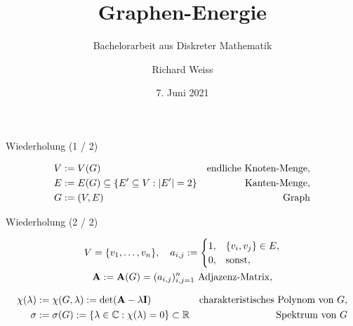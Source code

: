 \documentclass[aspectratio = 169]{beamer}
\title[Graphen-Energie]{Graphen-Energie}
\subtitle{Bachelorarbeit aus Diskreter Mathematik}
\author[R. Weiss]{Richard Weiss}
\institute[TU Wien]{TU Wien, Vienna, Austria}
\date{7. Juni 2021}
\begin{document}

\begin{frame}
    \titlepage
\end{frame}            


\begin{frame}{Wiederholung (1 / 2)}

    \begin{definition*}
    
        \begin{align*}
            V & := V(G)                                                          & \text{endliche Knoten-Menge}, \\
            E & := E(G) \subseteq {\left \{ E^\prime \subseteq V: |E^\prime| = 2 \right \}} & \text{Kanten-Menge}, \\
            G & := (V, E)                                                        & \text{Graph}
        \end{align*}

    \end{definition*}    

\end{frame}


\begin{frame}{Wiederholung (2 / 2)}

    \begin{definition*}
    
        \begin{gather*}
            V = {\left \{ v_1, \dots, v_n \right \}},
            \quad
            a_{i, j}
            :=
            \begin{cases}
                1, & {\left \{ v_i, v_j \right \}} \in E, \\
                0, & \text{sonst},
            \end{cases} \\
            \mathbf A := \mathbf A(G) = (a_{i, j})_{i,j=1}^n ~\text{Adjazenz-Matrix},
        \end{gather*}
    
        \begin{align*}
            \chi(\lambda)
            & :=
            \chi(G, \lambda)
            :=
            \det(\mathbf A - \lambda \mathbf I)
            & \text{charakteristisches Polynom von $G$}, \\
            \sigma
            & :=
            \sigma(G)
            :=
            {\left \{ \lambda \in \mathbb C: \chi(\lambda) = 0 \right \}}
            \subset
            \mathbb R
            & \text{Spektrum von $G$}
        \end{align*}

    \end{definition*}    

\end{frame}
\end{document}
